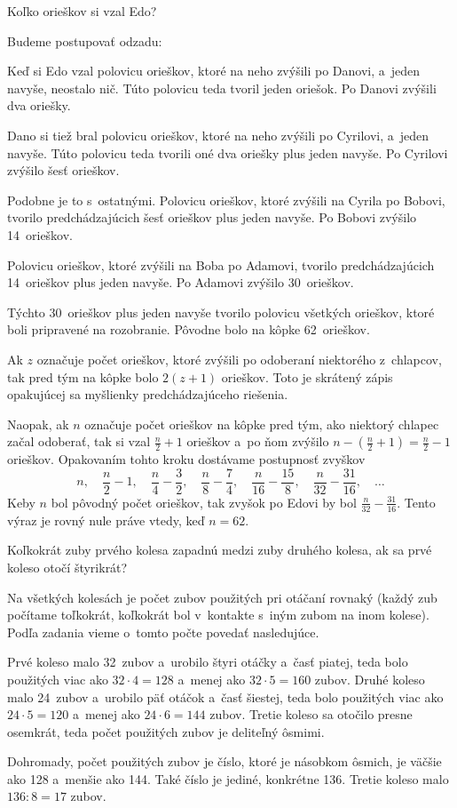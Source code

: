 {%
\napad
Koľko orieškov si vzal Edo?

\riesenie
Budeme postupovať odzadu:

Keď si Edo vzal polovicu orieškov, ktoré na neho zvýšili po Danovi, a~jeden navyše, neostalo nič.
Túto polovicu teda tvoril jeden oriešok.
Po Danovi zvýšili dva oriešky.

Dano si tiež bral polovicu orieškov, ktoré na neho zvýšili po Cyrilovi, a~jeden navyše.
Túto polovicu teda tvorili oné dva oriešky plus jeden navyše.
Po Cyrilovi zvýšilo šesť orieškov.

Podobne je to s~ostatnými.
Polovicu orieškov, ktoré zvýšili na Cyrila po Bobovi, tvorilo predchádzajúcich šesť orieškov plus jeden navyše.
Po Bobovi zvýšilo 14~orieškov.

Polovicu orieškov, ktoré zvýšili na Boba po Adamovi, tvorilo predchádzajúcich 14~orieškov plus jeden navyše.
Po Adamovi zvýšilo 30~orieškov.

Týchto 30~orieškov plus jeden navyše tvorilo polovicu všetkých orieškov, ktoré boli pripravené na rozobranie.
Pôvodne bolo na kôpke 62~orieškov.

\poznamka
Ak $z$ označuje počet orieškov, ktoré zvýšili po odoberaní niektorého z~chlapcov, tak pred tým na kôpke bolo $2(z+1)$ orieškov.
Toto je skrátený zápis opakujúcej sa myšlienky predchádzajúceho riešenia.

Naopak, ak $n$ označuje počet orieškov na kôpke pred tým, ako niektorý chlapec začal odoberať, tak si vzal $\frac{n}2+1$ orieškov a~po ňom zvýšilo $n-\left( \frac{n}2+1 \right)=\frac{n}2-1$ orieškov.
Opakovaním tohto kroku dostávame postupnosť zvyškov
$$
n,\quad
\frac{n}2-1,\quad
\frac{n}4-\frac32,\quad
\frac{n}8-\frac74,\quad
\frac{n}{16}-\frac{15}8,\quad
\frac{n}{32}-\frac{31}{16},\quad\dots
$$
Keby $n$ bol pôvodný počet orieškov, tak zvyšok po Edovi by bol $\frac{n}{32}-\frac{31}{16}$.
Tento výraz je rovný nule práve vtedy, keď $n=62$.
}

{%
\napad
Koľkokrát zuby prvého kolesa zapadnú medzi zuby druhého kolesa, ak sa prvé koleso otočí štyrikrát?

\riesenie
Na všetkých kolesách je počet zubov použitých pri otáčaní rovnaký (každý zub počítame toľkokrát, koľkokrát bol v~kontakte s~iným zubom na inom kolese). Podľa zadania vieme o~tomto počte povedať nasledujúce.

Prvé koleso malo 32~zubov a~urobilo štyri otáčky a~časť piatej, teda bolo použitých viac ako $32\cdot4=128$ a~menej ako $32\cdot5=160$ zubov.
Druhé koleso malo 24~zubov a~urobilo päť otáčok a~časť šiestej, teda bolo použitých viac ako $24\cdot5=120$ a~menej ako $24\cdot6=144$ zubov.
Tretie koleso sa otočilo presne osemkrát, teda počet použitých zubov je deliteľný ôsmimi.

Dohromady, počet použitých zubov je číslo, ktoré je násobkom ôsmich, je väčšie ako 128 a~menšie ako 144.
Také číslo je jediné, konkrétne 136.
Tretie koleso malo ${136:8}=17$ zubov.
}

